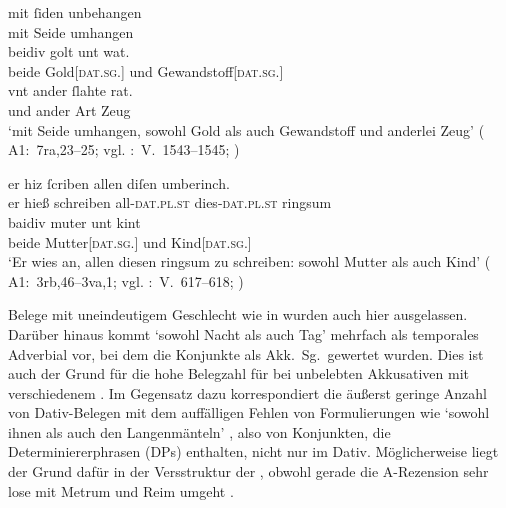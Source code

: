 \begin{exe}
\ex \label{ex:datregul}
	\gll mit ſiden unbehangen \\
		mit Seide umhangen \\
\sn \gll beidiv golt unt wat. \\
		beide Gold[\textsc{dat.sg.\NeutI}] und Gewandstoff[\textsc{dat.sg.\FemI}] \\
\sn \gll vnt ander ſlahte rat. \\
		und ander Art Zeug \\
	\trans `mit Seide umhangen, sowohl Gold als auch Gewandstoff und
		anderlei Zeug'
		(%
			A1:~7ra,23--25; vgl.
			\KC:~V.~1543--1545;
			\cite[109]{schroeder1895}%
		)

\ex \label{ex:datextra}
		\gll er hiz ſcriben allen diſen umberinch. \\
			er hieß schreiben all-\textsc{dat.pl.st} dies-\textsc{dat.pl.st} ringsum \\
	\sn \gll baidiv muter unt kint \\
			beide Mutter[\textsc{dat.sg.\FemF}] und Kind[\textsc{dat.sg.\NeutA}] \\
		\trans `Er wies an, allen diesen ringsum zu schreiben: sowohl
			Mutter als auch Kind'
			(%
				A1:~3rb,46--3va,1; vgl.
				\KC:~V.~617--618;
				\cite[92]{schroeder1895}%
			)

\end{exe}

Belege mit uneindeutigem Geschlecht wie in 
wurden auch hier ausgelassen. Darüber hinaus kommt 
`sowohl Nacht als auch Tag' mehrfach als temporales Adverbial
vor, bei dem die Konjunkte als Akk.\ Sg.\ gewertet wurden. Dies ist auch der
Grund für die hohe Belegzahl für  bei unbelebten
Akkusativen mit verschiedenem . Im Gegensatz dazu korrespondiert die
äußerst geringe Anzahl von Dativ-Belegen mit dem auffälligen Fehlen von
Formulierungen wie  `sowohl ihnen als auch
den Langenmänteln' \autocites(Nr.~249, Augsburg, 1280)[382,8]{cao1}, also von
Konjunkten, die Determiniererphrasen (DPs) enthalten, nicht nur im Dativ.
Möglicherweise liegt der Grund dafür in der Versstruktur der \KC{}, obwohl
gerade die A-Rezension sehr lose mit Metrum und Reim umgeht
\autocite[92]{wolf2008}.


